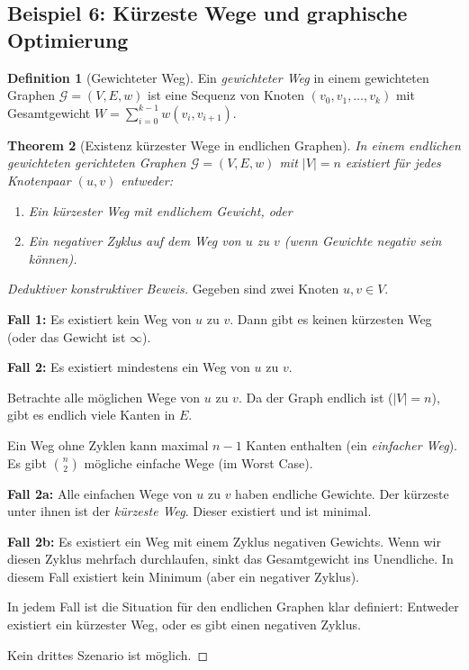 \documentclass[12pt, a4paper]{article}
\newtheorem{theorem}{Theorem}[section]
\theoremstyle{definition}
\newtheorem{definition}[theorem]{Definition}
\theoremstyle{remark}
\newcommand{\Graph}{\mathcal{G}}
\begin{document}
\subsection{Beispiel 6: Kürzeste Wege und graphische Optimierung}
\label{subsec:beispiel_kuerzeste_wege}

\begin{definition}[Gewichteter Weg]
\label{def:gewichteter_weg}
Ein \emph{gewichteter Weg} in einem gewichteten Graphen $\Graph = (V, E, w)$ ist eine Sequenz von Knoten $(v_0, v_1, \ldots, v_k)$ mit Gesamtgewicht $W = \sum_{i=0}^{k-1} w(v_i, v_{i+1})$.
\end{definition}

\begin{theorem}[Existenz kürzester Wege in endlichen Graphen]
\label{thm:kuerzeste_wege}
In einem endlichen gewichteten gerichteten Graphen $\Graph = (V, E, w)$ mit $|V| = n$ existiert für jedes Knotenpaar $(u, v)$ entweder:
\begin{enumerate}[label=(\alph*)]
  \item Ein kürzester Weg mit endlichem Gewicht, oder
  \item Ein negativer Zyklus auf dem Weg von $u$ zu $v$ (wenn Gewichte negativ sein können).
\end{enumerate}
\end{theorem}

\begin{proof}[Deduktiver konstruktiver Beweis]
Gegeben sind zwei Knoten $u, v \in V$.

\textbf{Fall 1:} Es existiert kein Weg von $u$ zu $v$. Dann gibt es keinen kürzesten Weg (oder das Gewicht ist $\infty$).

\textbf{Fall 2:} Es existiert mindestens ein Weg von $u$ zu $v$.

Betrachte alle möglichen Wege von $u$ zu $v$. Da der Graph endlich ist ($|V| = n$), gibt es endlich viele Kanten in $E$. 

Ein Weg ohne Zyklen kann maximal $n-1$ Kanten enthalten (ein \emph{einfacher Weg}). Es gibt $\binom{n}{2}$ mögliche einfache Wege (im Worst Case).

\textbf{Fall 2a:} Alle einfachen Wege von $u$ zu $v$ haben endliche Gewichte. Der kürzeste unter ihnen ist der \emph{kürzeste Weg}. Dieser existiert und ist minimal.

\textbf{Fall 2b:} Es existiert ein Weg mit einem Zyklus negativen Gewichts. Wenn wir diesen Zyklus mehrfach durchlaufen, sinkt das Gesamtgewicht ins Unendliche. In diesem Fall existiert kein Minimum (aber ein negativer Zyklus).

In jedem Fall ist die Situation für den endlichen Graphen klar definiert: Entweder existiert ein kürzester Weg, oder es gibt einen negativen Zyklus.

Kein drittes Szenario ist möglich.
\end{proof}
\end{document}
